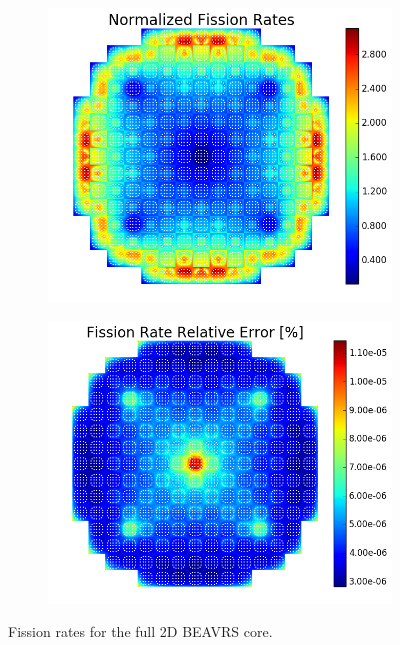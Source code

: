 \begin{figure}[h!]
\centering
\begin{subfigure}{0.5\textwidth}
  \centering
  \includegraphics[width=\linewidth]{figures/benchmarks/fission-rates/fiss-mean-full-core}
  \caption{}
  \label{fig:chap7-fiss-rate-mean-full-core}
\end{subfigure}%
\begin{subfigure}{0.5\textwidth}
  \centering
  \includegraphics[width=\linewidth]{figures/benchmarks/fission-rates/fiss-rel-err-full-core}
  \caption{}
  \label{fig:chap7-fiss-rate-rel-err-full-core}
\end{subfigure}%
\caption[Fission rates for the full 2D BEAVRS core]{Fission rates for the full 2D \ac{BEAVRS} core.}
\label{fig:chap7-fiss-rates-full-core}
\end{figure}

